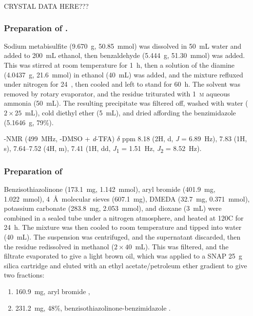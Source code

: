 \begin{refsection}
CRYSTAL DATA HERE???

\subsubsection{Preparation of .}
Sodium metabisulfite (9.670~g, 50.85~mmol) was dissolved in 50~mL water and added to 200~mL ethanol, then benzaldehyde (5.444~g, 51.30~mmol) was added.
This was stirred at room temperature for 1~h, then a solution of the diamine  (4.0437~g, 21.6~mmol) in ethanol (40~mL) was added, and the mixture refluxed under nitrogen for 24~, then cooled and left to stand for 60~h.
The solvent was removed by rotary evaporator, and the residue triturated with 1~\textsc{m} aqueous ammonia (50~mL). 
The resulting precipitate was filtered off, washed with water ($2\times25$~mL), cold diethyl ether (5~mL), and dried affording the benzimidazole  (5.1646~g, 79\%).

-NMR (499~MHz, -DMSO + \textit{d}-TFA) $\delta$ ppm 8.18 (2H, d, \emph{J} = 6.89~Hz), 7.83 (1H, s), 7.64--7.52 (4H, m), 7.41 (1H, dd, \emph{J}\textsubscript{1} = 1.51~Hz, \emph{J}\textsubscript{2} = 8.52~Hz).

\subsubsection{Preparation of }
Benzisothiazolinone  (173.1~mg, 1.142~mmol), aryl bromide  (401.9~mg, 1.022~mmol), 4~\AA\ molecular sieves (607.1~mg), DMEDA (32.7~mg, 0.371~mmol), potassium carbonate (283.8~mg, 2.053~mmol), and dioxane (3~mL) were combined in a sealed tube under a nitrogen atmosphere, and heated at 120\degree{}C for 24~h.
The mixture was then cooled to room temperature and tipped into water (40~mL).
The suspension was centrifuged, and the supernatant discarded, then the residue redissolved in methanol ($2\times40$~mL).
This was filtered, and the filtrate evaporated to give a light brown oil, which was applied to a SNAP 25~g silica cartridge and eluted with an ethyl acetate/petroleum ether gradient to give two fractions:
\begin{enumerate}
    \item 160.9~mg, aryl bromide ,
    \item 231.2~mg, 48\%, benzisothiazolinone-benzimidazole .
\end{enumerate}


\end{refsection}
